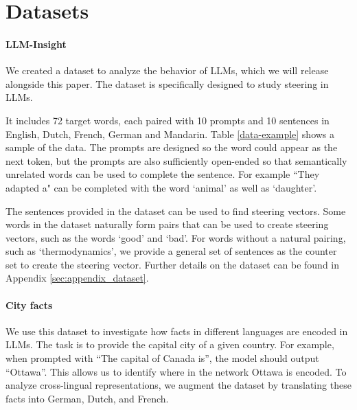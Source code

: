 \section{Datasets} \label{sec:datasets}

\paragraph{LLM-Insight}
We created a dataset to analyze the behavior of LLMs, which we will release alongside this paper. The dataset is specifically designed to study steering in LLMs. 

It includes 72 target words, each paired with 10 prompts and 10 sentences in English, Dutch, French, German and Mandarin. Table \ref{data-example} shows a sample of the data. 
The prompts are designed so the word could appear as the next token, but the prompts are also sufficiently open-ended so that semantically unrelated words can be used to complete the sentence.
For example ``They adapted a" can be completed with the word `animal' as well as `daughter'. 

The sentences provided in the dataset can be used to find steering vectors.
Some words in the dataset naturally form pairs that can be used to create steering vectors, such as the words `good' and `bad'. For words without a natural pairing, such as `thermodynamics', we provide a general set of sentences as the counter set to create the steering vector. Further details on the dataset can be found in Appendix \ref{sec:appendix_dataset}.

\paragraph{City facts \cite{ghandeharioun2024patchscope}}
We use this dataset to investigate how facts in different languages are encoded in LLMs. The task is to provide the capital city of a given country.
For example, when prompted with “The capital of Canada is”, the model should output “Ottawa”. 
This allows us to identify where in the network Ottawa is encoded.
To analyze cross-lingual representations, we augment the dataset by translating these facts into German, Dutch, and French. 